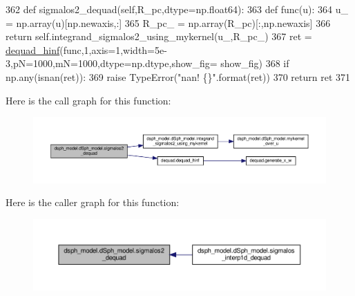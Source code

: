\begin{DoxyCode}
362     \textcolor{keyword}{def }sigmalos2\_dequad(self,R\_pc,dtype=np.float64):
363         \textcolor{keyword}{def }func(u):
364             u\_ = np.array(u)[np.newaxis,:]
365             R\_pc\_ = np.array(R\_pc)[:,np.newaxis]
366             \textcolor{keywordflow}{return} self.integrand\_sigmalos2\_using\_mykernel(u\_,R\_pc\_)
367         ret = \hyperlink{namespacedequad_a2654bb61f33ab8685320882396c81ae0}{dequad\_hinf}(func,1,axis=1,width=5e-3,pN=1000,mN=1000,dtype=np.dtype,show\_fig=
      show\_fig)
368         \textcolor{keywordflow}{if} np.any(isnan(ret)):
369             \textcolor{keywordflow}{raise} TypeError(\textcolor{stringliteral}{"nan! \{\}"}.format(ret))
370         \textcolor{keywordflow}{return} ret
371     
\end{DoxyCode}
Here is the call graph for this function\+:
\nopagebreak
\begin{figure}[H]
\begin{center}
\leavevmode
\includegraphics[width=350pt]{d0/d25/classdsph__model_1_1dSph__model_a87273cf6ad641b1d12f9b236821807c6_cgraph}
\end{center}
\end{figure}
Here is the caller graph for this function\+:
\nopagebreak
\begin{figure}[H]
\begin{center}
\leavevmode
\includegraphics[width=350pt]{d0/d25/classdsph__model_1_1dSph__model_a87273cf6ad641b1d12f9b236821807c6_icgraph}
\end{center}
\end{figure}
\mbox{\label{classdsph__model_1_1dSph__model_a855543fee6bd37d3b2e185c2b9dee49e}} 
